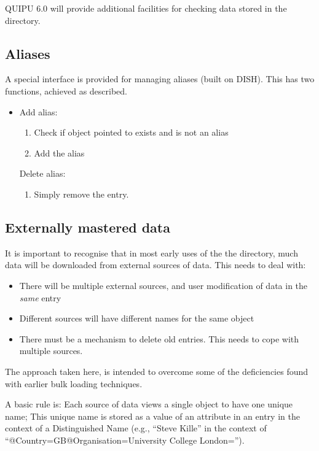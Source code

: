 QUIPU 6.0 will provide additional facilities for checking data stored in the
directory.

\subsection {Aliases}

A special interface is provided for managing aliases (built on DISH).
This has two functions, achieved as described.

\begin {itemize}
\item 

Add alias:
\begin {enumerate}
\item Check if object pointed to exists and is not an alias
\item Add the alias
\end {enumerate}

Delete alias:
\begin {enumerate}
\item Simply remove the entry.
\end {enumerate}

\end {itemize}



\subsection {Externally mastered data}

It is important to recognise that in most early uses of the the directory,
much data will be downloaded from external sources of data.  This needs to
deal with:

\begin {itemize}
\item There will be multiple external sources, and user modification of data
in the {\em same} entry
\item Different sources will have different names for the same object
\item There must be a mechanism to delete old entries.  This needs to cope
with multiple sources.
\end {itemize}

The approach taken here, is intended to overcome some of the deficiencies
found with earlier bulk loading techniques.


A basic rule is: Each source of data views a single object to have one
unique name;  This unique name is stored as a value of an attribute in an
entry in the context of a Distinguished Name (e.g., ``Steve Kille'' in the
context of ``@Country=GB@Organisation=University College London='').

